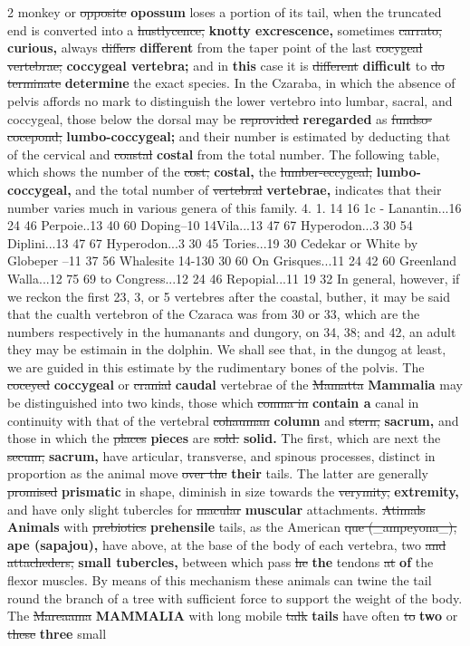 \documentclass[10pt]{article}
\begin{document}
\begin{multicols}{2}
monkey or \sout{opposite} \textbf{opossum} loses a portion of its tail, when the truncated end is converted into a \sout{hustlycence,} \textbf{knotty excrescence,} sometimes \sout{carrato,} \textbf{curious,} always \sout{differs} \textbf{different} from the taper point of the last \sout{cocygeal vertebrae;} \textbf{coccygeal vertebra;} and in \textbf{this} case it is \sout{different} \textbf{difficult} to \sout{do terminate} \textbf{determine} the exact species. In the Czaraba, in which the absence of pelvis affords no mark to distinguish the lower vertebro into lumbar, sacral, and coccygeal, those below the dorsal may be \sout{reprovided} \textbf{reregarded} as \sout{fundso-cocepond;} \textbf{lumbo-coccygeal;} and their number is estimated by deducting that of the cervical and \sout{coastal} \textbf{costal} from the total number. The following table, which shows the number of the \sout{cost,} \textbf{costal,} the \sout{lumber-eccygeal,} \textbf{lumbo-coccygeal,} and the total number of \sout{vertebral} \textbf{vertebrae,} indicates that their number varies much in various genera of this family. 4. 1. 14 16 1c - Lanantin...16 24 46 Perpoie..13 40 60 Doping–10 14Vila...13 47 67 Hyperodon...3 30 54 Diplini...13 47 67 Hyperodon...3 30 45 Tories...19 30 Cedekar or White by Globeper –11 37 56 Whalesite 14-130 30 60 On Grisques...11 24 42 60 Greenland Walla...12 75 69 to Congress...12 24 46 Repopial...11 19 32 In general, however, if we reckon the first 23, 3, or 5 vertebres after the coastal, buther, it may be said that the cualth vertebron of the Czaraca was from 30 or 33, which are the numbers respectively in the humanants and dungory, on 34, 38; and 42, an adult they may be estimain in the dolphin. We shall see that, in the dungog at least, we are guided in this estimate by the rudimentary bones of the polvis. The \sout{coceyed} \textbf{coccygeal} or \sout{cranial} \textbf{caudal} vertebrae of the \sout{Mamatta} \textbf{Mammalia} may be distinguished into two kinds, those which \sout{conma in} \textbf{contain a} canal in continuity with that of the vertebral \sout{cohauman} \textbf{column} and \sout{stern,} \textbf{sacrum,} and those in which the \sout{places} \textbf{pieces} are \sout{sold.} \textbf{solid.} The first, which are next the \sout{secum,} \textbf{sacrum,} have articular, transverse, and spinous processes, distinct in proportion as the animal move \sout{over the} \textbf{their} tails. The latter are generally \sout{promised} \textbf{prismatic} in shape, diminish in size towards the \sout{verymity,} \textbf{extremity,} and have only slight tubercles for \sout{macular} \textbf{muscular} attachments. \sout{Atimals} \textbf{Animals} with \sout{prebiotics} \textbf{prehensile} tails, as the American \sout{que (\_ampeyona\_),} \textbf{ape (sapajou),} have above, at the base of the body of each vertebra, two \sout{and attacheders,} \textbf{small tubercles,} between which pass \sout{he} \textbf{the} tendons \sout{at} \textbf{of} the flexor muscles. By means of this mechanism these animals can twine the tail round the branch of a tree with sufficient force to support the weight of the body. The \sout{Mareaama} \textbf{MAMMALIA} with long mobile \sout{talk} \textbf{tails} have often \sout{to} \textbf{two} or \sout{these} \textbf{three} small 
\end{multicols}
\end{document}

